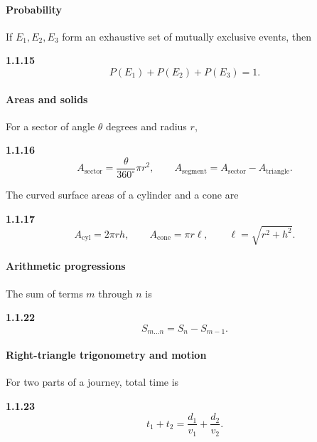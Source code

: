 \paragraph*{Probability}
\setcounter{enumii}{15}\setcounter{equation}{0}
If $E_1,E_2,E_3$ form an exhaustive set of mutually exclusive events, then
\par\noindent\textbf{1.1.15}\quad
\begin{equation}
P(E_1)+P(E_2)+P(E_3)=1.\tag{1.1.15.1}\label{eq:three-events}
\end{equation}


\setcounter{enumii}{16}\setcounter{equation}{0}
\paragraph*{Areas and solids}
For a sector of angle $\theta$ degrees and radius $r$,

\par\noindent\textbf{1.1.16}\quad
\begin{equation}
A_{\mathrm{sector}}=\frac{\theta}{360^\circ}\pi r^2,\qquad
A_{\mathrm{segment}}=A_{\mathrm{sector}}-A_{\mathrm{triangle}}.
\label{eq:sector-segment}
\end{equation}

\setcounter{enumii}{17}\setcounter{equation}{0}
The curved surface areas of a cylinder and a cone are

\par\noindent\textbf{1.1.17}\quad
\begin{equation}
A_{\mathrm{cyl}}=2\pi rh,\qquad A_{\mathrm{cone}}=\pi r\ell,\qquad \ell=\sqrt{r^2+h^2}.
\label{eq:cone-formula}
\end{equation}

\paragraph*{Arithmetic progressions}
\setcounter{enumii}{22}\setcounter{equation}{0}
The sum of terms $m$ through $n$ is
\par\noindent\textbf{1.1.22}\quad
\begin{equation}
S_{m\ldots n}=S_n-S_{m-1}.\tag{1.1.22.1}\label{eq:ap-subsum}
\end{equation}

\paragraph*{Right-triangle trigonometry and motion}
\setcounter{enumii}{23}\setcounter{equation}{0}
For two parts of a journey, total time is
\par\noindent\textbf{1.1.23}\quad
\begin{equation}
t_1+t_2=\frac{d_1}{v_1}+\frac{d_2}{v_2}.\tag{1.1.23.1}\label{eq:two-part-time}
\end{equation}

